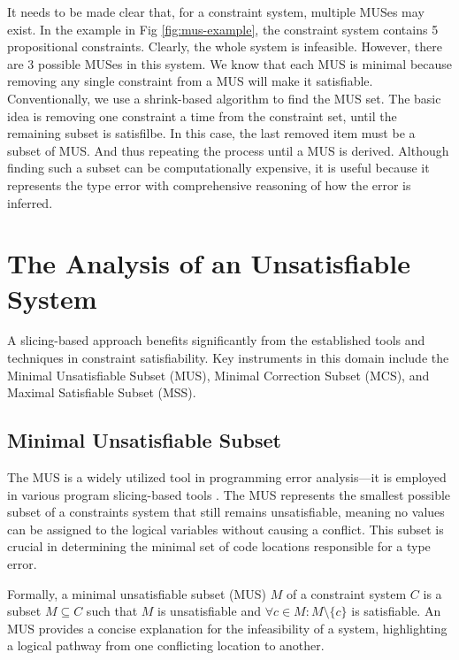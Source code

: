 It needs to be made clear that, for a constraint system, multiple MUSes may exist. In the example in Fig \ref{fig:mus-example}, the constraint system contains 5 propositional constraints. Clearly, the whole system is infeasible. However, there are 3 possible MUSes in this system. We know that each MUS is minimal because removing any single constraint from a MUS will make it satisfiable. Conventionally, we use a shrink-based algorithm to find the MUS set. The basic idea is removing one constraint a time from the constraint set, until the remaining subset is satisfilbe. In this case, the last removed item must be a subset of MUS. And thus repeating the process until a MUS is derived. Although finding such a subset can be computationally expensive, it is useful because it represents the type error with comprehensive reasoning of how the error is inferred.



\section{The Analysis of an Unsatisfiable System}

A slicing-based approach benefits significantly from the established tools and techniques in constraint satisfiability. Key instruments in this domain include the Minimal Unsatisfiable Subset (MUS), Minimal Correction Subset (MCS), and Maximal Satisfiable Subset (MSS).

\subsection{Minimal Unsatisfiable Subset}

The MUS is a widely utilized tool in programming error analysis—it is employed in various program slicing-based tools \cite{Haack2004-fr, Pavlinovic2015-ke, Stuckey2003-pz}. The MUS represents the smallest possible subset of a constraints system that still remains unsatisfiable, meaning no values can be assigned to the logical variables without causing a conflict. This subset is crucial in determining the minimal set of code locations responsible for a type error.


Formally,  a minimal unsatisfiable subset (MUS) $M$ of a constraint system $C$ is a subset $M \subseteq C$ such that $M$ is unsatisfiable and $ \forall{c} \in M : M \setminus \{c\}$ is satisfiable.  An MUS provides a concise explanation for the infeasibility of a system, highlighting a logical pathway from one conflicting location to another.

